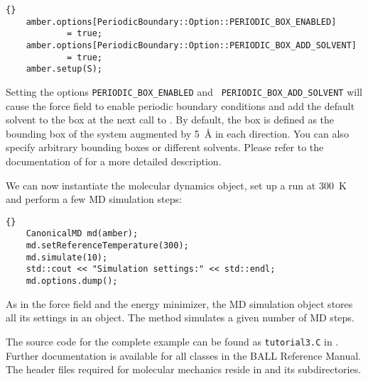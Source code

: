\begin{lstlisting}{}
	amber.options[PeriodicBoundary::Option::PERIODIC_BOX_ENABLED] 
			= true;
	amber.options[PeriodicBoundary::Option::PERIODIC_BOX_ADD_SOLVENT] 
			= true;
	amber.setup(S);
\end{lstlisting}

\noindent
Setting the options {\tt PERIODIC\_BOX\_ENABLED} and {\tt
PERIODIC\_BOX\_ADD\_SOLVENT} will cause the force field to enable periodic
boundary conditions and add the default solvent to the box at the next call
to . By default, the box is defined as the bounding box of the
system augmented by 5~\AA{} in each direction. You can also specify arbitrary
bounding boxes or different solvents. Please refer to the documentation of
 for a more detailed description.

We can now instantiate the molecular dynamics object, set up a run at 300~K and
perform a few  MD simulation steps:

\begin{lstlisting}{}
	CanonicalMD md(amber);
	md.setReferenceTemperature(300);
	md.simulate(10);
	std::cout << "Simulation settings:" << std::endl;
	md.options.dump();
\end{lstlisting}

\noindent
As in the force field and the energy minimizer, the MD simulation object
stores all its settings in an  object. The
 method simulates a given number of MD
steps. 

The source code for the complete example can be found as {\tt tutorial3.C}
in . Further documentation is available for all
classes in the BALL Reference Manual. The header files required for molecular
mechanics reside in  and its subdirectories.
